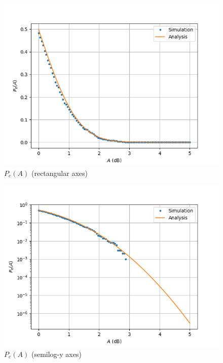 \documentclass[journal,12pt,twocolumn]{IEEEtran}
\renewcommand\thesection{\arabic{section}}
\begin{document}
\begin{enumerate}[label=\thesection.\arabic*
,ref=\thesection.\theenumi]
\begin{figure}[!htb]
	\includegraphics[width=\columnwidth]{figs/5_6.png}
	\caption{$P_e(A)$ (rectangular axes)}
	\label{fig:ber-snr}
\end{figure}
\begin{figure}[!htb]
	\includegraphics[width=\columnwidth]{figs/5_6_semilogy.png}
	\caption{$P_e(A)$ (semilog-y axes)}
	\label{fig:ber-snr-semilog}
\end{figure}
\end{enumerate}
\end{document}
